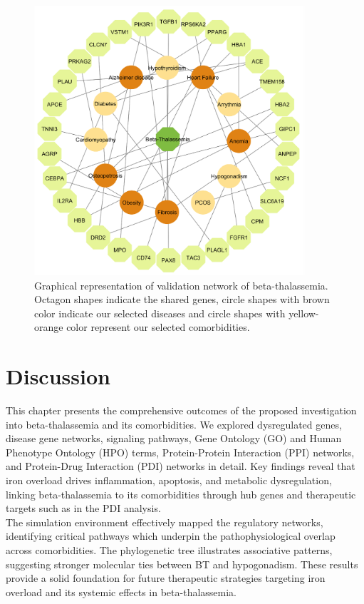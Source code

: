 \begin{figure}[H]
    \centering
    \includegraphics[height=10cm]{./fig/fig4_16.png}
    \centering
    \caption{Graphical representation of validation network of beta-thalassemia. Octagon shapes indicate the shared genes, circle shapes with brown color indicate our selected diseases and circle shapes with yellow-orange color represent our selected comorbidities.}
    \label{fig:drug_disease_network}
\end{figure}

\section{Discussion}
This chapter presents the comprehensive outcomes of the proposed investigation into beta-thalassemia and its comorbidities. We explored dysregulated genes, disease gene networks, signaling pathways, Gene Ontology (GO) and Human Phenotype Ontology (HPO) terms, Protein-Protein Interaction (PPI) networks, and Protein-Drug Interaction (PDI) networks in detail. Key findings reveal that iron overload drives inflammation, apoptosis, and metabolic dysregulation, linking beta-thalassemia to its comorbidities through hub genes and therapeutic targets such as in the PDI analysis.\\


The simulation environment effectively mapped the regulatory networks, identifying critical pathways which underpin the pathophysiological overlap across comorbidities. The phylogenetic tree illustrates associative patterns, suggesting stronger molecular ties between BT and hypogonadism. These results provide a solid foundation for future therapeutic strategies targeting iron overload and its systemic effects in beta-thalassemia.

